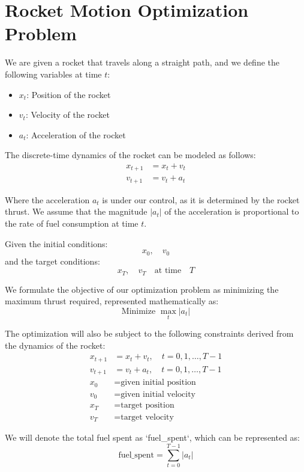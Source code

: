 \documentclass{article}
\begin{document}
\section*{Rocket Motion Optimization Problem}

We are given a rocket that travels along a straight path, and we define the following variables at time \( t \):
\begin{itemize}
    \item \( x_t \): Position of the rocket
    \item \( v_t \): Velocity of the rocket
    \item \( a_t \): Acceleration of the rocket
\end{itemize}

The discrete-time dynamics of the rocket can be modeled as follows:
\begin{align}
    x_{t+1} &= x_t + v_t \\
    v_{t+1} &= v_t + a_t
\end{align}

Where the acceleration \( a_t \) is under our control, as it is determined by the rocket thrust. We assume that the magnitude \( |a_t| \) of the acceleration is proportional to the rate of fuel consumption at time \( t \).

Given the initial conditions:
\[
x_0, \quad v_0
\]
and the target conditions:
\[
x_T, \quad v_T \quad \text{at time} \quad T
\]

We formulate the objective of our optimization problem as minimizing the maximum thrust required, represented mathematically as:
\[
\text{Minimize } \max_{t} |a_t|
\]

The optimization will also be subject to the following constraints derived from the dynamics of the rocket:
\begin{align}
    x_{t+1} &= x_t + v_t, \quad t = 0, 1, \ldots, T-1 \\
    v_{t+1} &= v_t + a_t, \quad t = 0, 1, \ldots, T-1 \\
    x_0 &= \text{given initial position} \\
    v_0 &= \text{given initial velocity} \\
    x_T &= \text{target position} \\
    v_T &= \text{target velocity}
\end{align}

We will denote the total fuel spent as `fuel_spent`, which can be represented as:
\[
\text{fuel\_spent} = \sum_{t=0}^{T-1} |a_t|
\]
\end{document}
